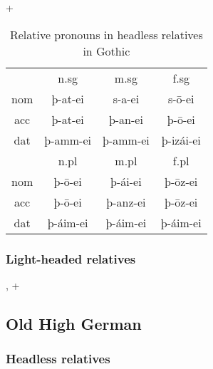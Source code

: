  + 

\begin{table}[H]
	\center
	\caption {Relative pronouns in headless relatives in Gothic}
		\begin{tabular}{cccc}
		\toprule
							& \ac{n}.\ac{sg} 	& \ac{m}.\ac{sg}	& \ac{f}.\ac{sg}  \\
		 						\cmidrule{2-4}
    \ac{nom} 	& þ-at-ei 	 			& s-a-ei 					& s-ō-ei					\\
    \ac{acc}	& þ-at-ei    			& þ-an-ei  				& þ-ō-ei  				\\
    \ac{dat} 	& þ-amm-ei 				& þ-amm-ei				& þ-izái-ei 			\\
		\bottomrule
    					& \ac{n}.\ac{pl}	& \ac{m}.\ac{pl}	& \ac{f}.\ac{pl}	\\
						    \cmidrule{2-4}
    \ac{nom} 	& þ-ō-ei					&	þ-ái-ei					&	þ-ōz-ei					\\
    \ac{acc} 	& þ-ō-ei 					&	þ-anz-ei				&	þ-ōz-ei					\\
    \ac{dat} 	& þ-áim-ei				&	þ-áim-ei 				&	þ-áim-ei 				\\
    \bottomrule
		\end{tabular}
\end{table}

\subsubsection{Light-headed relatives}

,  + 



\subsection{Old High German}

\subsubsection{Headless relatives}



